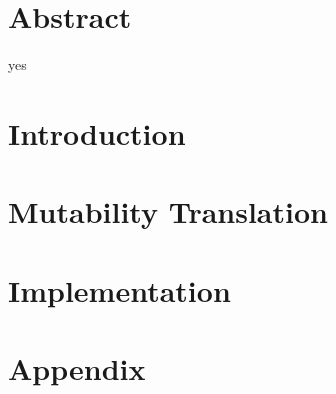 \frontmatter
\chapter*{Abstract}
yes


\tableofcontents

\mainmatter

\chapter{Introduction}


\chapter{Mutability Translation}
\label{translation}


\chapter{Implementation}
\label{implementation}



\appendix




\chapter{Appendix}

